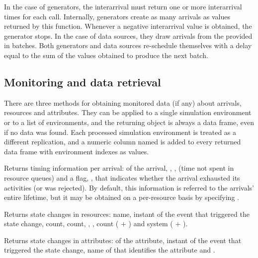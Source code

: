 \documentclass[
  nojss]{jss}
\providecommand{\tightlist}{%
  \setlength{\itemsep}{0pt}\setlength{\parskip}{0pt}}
\begin{document}
In the case of generators, the interarrival  must
return one or more interarrival times for each call. Internally,
generators create as many arrivals as values returned by this function.
Whenever a negative interarrival value is obtained, the generator stops.
In the case of data sources, they draw arrivals from the 
provided in batches. Both generators and data sources re-schedule
themselves with a delay equal to the sum of the values obtained to
produce the next batch.

\subsection{Monitoring and data
retrieval}\label{monitoring-and-data-retrieval}

There are three methods for obtaining monitored data (if any) about
arrivals, resources and attributes. They can be applied to a single
simulation environment or to a list of environments, and the returning
object is always a data frame, even if no data was found. Each processed
simulation environment is treated as a different replication, and a
numeric column named  is added to every returned data
frame with environment indexes as values.

\begin{description}
\tightlist
\item[get\_mon\_arrivals()]
Returns timing information per arrival:  of the arrival,
, ,  (time not spent
in resource queues) and a flag, , that indicates whether
the arrival exhausted its activities (or was rejected). By default, this
information is referred to the arrivals' entire lifetime, but it may be
obtained on a per-resource basis by specifying .
\item[get\_mon\_resources()]
Returns state changes in resources:  name, 
instant of the event that triggered the state change, 
count,  count, , ,
 count ( \(+\) ) and system
 ( \(+\) ).
\item[get\_mon\_attributes()]
Returns state changes in attributes:  of the attribute,
 instant of the event that triggered the state change, name
of  that identifies the attribute and .
\end{description}
\end{document}
